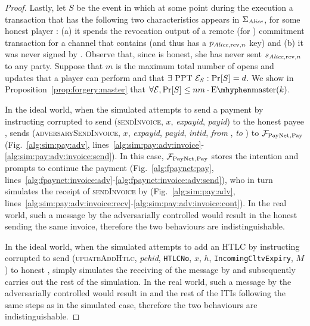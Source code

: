 \begin{proof}
  Lastly, let $S$ be the event in which at some point during the execution a
  transaction that has the following two characteristics appears in
  $\Sigma_{\mathit{Alice}}$, for some honest player \alice: (a) it spends the revocation
  output of a remote (for \alice{}) commitment transaction for a channel that
  contains \alice{} (and thus has a $p_{\mathit{Alice}, \mathrm{rev}, n}$ key) and (b)
  it was never signed by \alice. Observe that, since \alice{} is honest, she has
  never sent $s_{\mathit{Alice}, \mathrm{rev}, n}$ to any party. Suppose that $m$ is the
  maximum total number of opens and updates that a player can perform and that
  $\exists \text{ PPT } \mathcal{E}_S: \Pr[S] = d$. We show in
  Proposition~\ref{prop:forgery:master} that $\forall \environment, \Pr[S] \leq
  nm \cdot \mathrm{E \mhyphen master}(k)$.

  In the ideal world, when the simulated \adversary{} attempts to send a payment
  by instructing corrupted \alice{} to send (\textsc{sendInvoice}, $x$,
  \textit{expayid}, \textit{payid}) to the honest payee \bob, \simulator{} sends
  (\textsc{adversarySendInvoice}, $x$, \textit{expayid}, \textit{payid},
  \textit{intid}, \textit{from} \alice, \textit{to} \bob) to
  $\mathcal{F}_{\mathrm{PayNet}}{}_{\mathrm{, Pay}}$ (Fig.~\ref{alg:sim:pay:adv},
  lines~\ref{alg:sim:pay:adv:invoice}-\ref{alg:sim:pay:adv:invoice:send}). In
  this case, $\mathcal{F}_{\mathrm{PayNet}}{}_{\mathrm{, Pay}}$ stores the intention and prompts
  \simulator{} to continue the payment (Fig.~\ref{alg:fpaynet:pay},
  lines~\ref{alg:fpaynet:invoice:adv}-\ref{alg:fpaynet:invoice:adv:send}), who
  in turn simulates the receipt of \textsc{sendInvoice} by \bob{}
  (Fig.~\ref{alg:sim:pay:adv},
  lines~\ref{alg:sim:pay:adv:invoice:recv}-\ref{alg:sim:pay:adv:invoice:cont}).
  In the real world, such a message by the adversarially controlled \alice{}
  would result in the honest \bob{} sending the same invoice, therefore the two
  behaviours are indistinguishable.

  In the ideal world, when the simulated \adversary{} attempts to add an HTLC by
  instructing corrupted \alice{} to send (\textsc{updateAddHtlc},
  \textit{pchid}, \texttt{HTLCNo}, $x$, $h$, \texttt{IncomingCltvExpiry}, $M$)
  to honest \bob, \simulator{} simply simulates the receiving of the message by
  \bob{} and subsequently carries out the rest of the simulation. In the real
  world, such a message by the adversarially controlled \alice{} would result in
  \bob{} and the rest of the ITIs following the same steps as in the simulated
  case, therefore the two behaviours are indistinguishable.


\end{proof}
